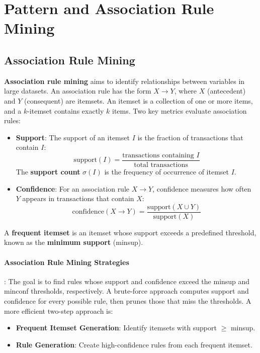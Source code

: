\section{Pattern and Association Rule Mining}
\subsection{Association Rule Mining}

\textbf{Association rule mining} aims to identify relationships between variables in large datasets. An association rule has the form \(X \rightarrow Y\), where \(X\) (antecedent) and \(Y\) (consequent) are itemsets. An itemset is a collection of one or more items, and a \(k\)-itemset contains exactly \(k\) items. Two key metrics evaluate association rules:

\begin{itemize}
    \item \textbf{Support}: The support of an itemset \(I\) is the fraction of transactions that contain \(I\):
    \[
    \text{support}(I) = \frac{\text{transactions containing }I}{\text{total transactions}}
    \]
    The \textbf{support count} \(\sigma(I)\) is the frequency of occurrence of itemset \(I\).
    
    \item \textbf{Confidence}: For an association rule \(X \rightarrow Y\), confidence measures how often \(Y\) appears in transactions that contain \(X\):
    \[
    \text{confidence}(X \rightarrow Y) = \frac{\text{support}(X \cup Y)}{\text{support}(X)}
    \]
\end{itemize}

A \textbf{frequent itemset} is an itemset whose support exceeds a predefined threshold, known as the \textbf{minimum support} (minsup).

\paragraph{Association Rule Mining Strategies}: The goal is to find rules whose support and confidence exceed the minsup and minconf thresholds, respectively. A brute-force approach computes support and confidence for every possible rule, then prunes those that miss the thresholds. A more efficient two-step approach is:
\begin{itemize}
    \item \textbf{Frequent Itemset Generation}: Identify itemsets with support \(\geq\) minsup.
    \item \textbf{Rule Generation}: Create high-confidence rules from each frequent itemset.
\end{itemize}

